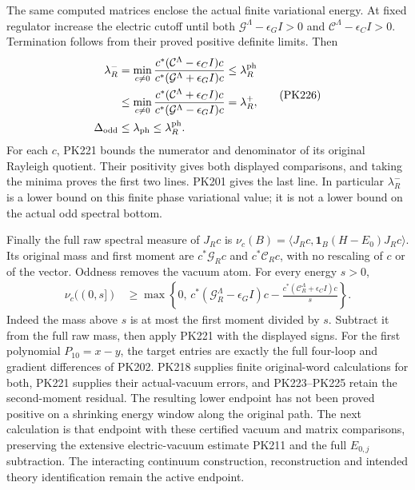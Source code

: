 \documentclass[11pt]{article}
\begin{document}
The same computed matrices enclose the actual finite
variational energy. At fixed regulator increase the electric
cutoff until both
\(\mathcal G^\Lambda-\epsilon_GI>0\) and
\(\mathcal C^\Lambda-\epsilon_CI>0\). Termination follows
from their proved positive definite limits. Then
\[
 \begin{split}
 \lambda_R^-&=\min_{c\ne0}
   \frac{c^*(\mathcal C^\Lambda-\epsilon_CI)c}
        {c^*(\mathcal G^\Lambda+\epsilon_GI)c}
       \le\lambda_R^{\rm ph}\\
 &\le
 \min_{c\ne0}
   \frac{c^*(\mathcal C^\Lambda+\epsilon_CI)c}
        {c^*(\mathcal G^\Lambda-\epsilon_GI)c}
       =\lambda_R^+,\\
 \Delta_{\rm odd}&\le\lambda_{\rm ph}\le\lambda_R^{\rm ph}.
 \end{split}\tag{PK226}
\]
For each \(c\), PK221 bounds the numerator and denominator
of its original Rayleigh quotient. Their positivity gives
both displayed comparisons, and taking the minima proves
the first two lines. PK201 gives the last line.
In particular \(\lambda_R^-\) is a lower bound on this
finite phase variational value; it is not a lower bound on
the actual odd spectral bottom.

Finally the full raw spectral measure of \(J_Rc\) is
\(\nu_c(B)=\langle J_Rc,\mathbf1_B(H-E_0)J_Rc\rangle\).
Its original mass and first moment are
\(c^*\mathcal G_Rc\) and \(c^*\mathcal C_Rc\), with no
rescaling of \(c\) or of the vector. Oddness removes the
vacuum atom. For every energy \(s>0\),
\[
 \begin{split}
 \nu_c((0,s])&\ge
 \max\left\{0,\,
  c^*(\mathcal G^\Lambda_R-\epsilon_GI)c
  -\frac{c^*(\mathcal C^\Lambda_R+\epsilon_CI)c}{s}
                                                    \right\}.
 \end{split}\tag{PK227}
\]
Indeed the mass above \(s\) is at most the first moment
divided by \(s\). Subtract it from the full raw mass, then
apply PK221 with the displayed signs. For the first
polynomial \(P_{10}=x-y\), the target entries are exactly
the full four-loop and gradient differences of PK202.
PK218 supplies finite original-word calculations for
both, PK221 supplies their actual-vacuum errors, and
PK223--PK225 retain the second-moment residual.
The resulting lower endpoint has not been proved positive
on a shrinking energy window along the original path.
The next calculation is that endpoint with these certified
vacuum and matrix comparisons, preserving the extensive
electric-vacuum estimate PK211 and the full \(E_{0,j}\)
subtraction. The interacting continuum construction,
reconstruction and intended theory identification remain
the active endpoint.
\end{document}
